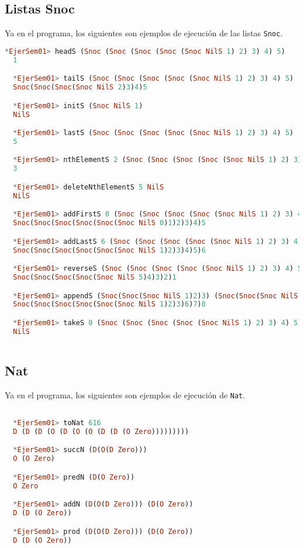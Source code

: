\documentclass[spanish,12pt,letterpaper]{article}
\begin{document}
\subsection{Listas Snoc}
Ya en el programa, los siguientes son ejemplos de ejecución de las listas \texttt{Snoc}.
\begin{lstlisting}[language=Haskell]
  *EjerSem01> headS (Snoc (Snoc (Snoc (Snoc (Snoc NilS 1) 2) 3) 4) 5)
  1

  *EjerSem01> tailS (Snoc (Snoc (Snoc (Snoc (Snoc NilS 1) 2) 3) 4) 5)
  Snoc(Snoc(Snoc(Snoc NilS 2)3)4)5

  *EjerSem01> initS (Snoc NilS 1)
  NilS

  *EjerSem01> lastS (Snoc (Snoc (Snoc (Snoc (Snoc NilS 1) 2) 3) 4) 5)
  5

  *EjerSem01> nthElementS 2 (Snoc (Snoc (Snoc (Snoc (Snoc NilS 1) 2) 3) 4) 5)
  3

  *EjerSem01> deleteNthElementS 5 NilS
  NilS

  *EjerSem01> addFirstS 0 (Snoc (Snoc (Snoc (Snoc (Snoc NilS 1) 2) 3) 4) 5)
  Snoc(Snoc(Snoc(Snoc(Snoc(Snoc NilS 0)1)2)3)4)5

  *EjerSem01> addLastS 6 (Snoc (Snoc (Snoc (Snoc (Snoc NilS 1) 2) 3) 4) 5)
  Snoc(Snoc(Snoc(Snoc(Snoc(Snoc NilS 1)2)3)4)5)6

  *EjerSem01> reverseS (Snoc (Snoc (Snoc (Snoc (Snoc NilS 1) 2) 3) 4) 5)
  Snoc(Snoc(Snoc(Snoc(Snoc NilS 5)4)3)2)1

  *EjerSem01> appendS (Snoc(Snoc(Snoc NilS 1)2)3) (Snoc(Snoc(Snoc NilS 6)7)8)
  Snoc(Snoc(Snoc(Snoc(Snoc(Snoc NilS 1)2)3)6)7)8

  *EjerSem01> takeS 0 (Snoc (Snoc (Snoc (Snoc (Snoc NilS 1) 2) 3) 4) 5)
  NilS
  
\end{lstlisting}

\subsection{Nat}
Ya en el programa, los siguientes son ejemplos de ejecución de \texttt{Nat}.
\begin{lstlisting}[language=Haskell]

  *EjerSem01> toNat 616
  D (D (D (O (D (O (O (D (D (O Zero)))))))))

  *EjerSem01> succN (D(O(D Zero)))
  O (O Zero)

  *EjerSem01> predN (D(O Zero))
  O Zero

  *EjerSem01> addN (D(O(D Zero))) (D(O Zero))
  D (D (O Zero))

  *EjerSem01> prod (D(O(D Zero))) (D(O Zero))
  D (D (O Zero))

\end{lstlisting}
\end{document}
